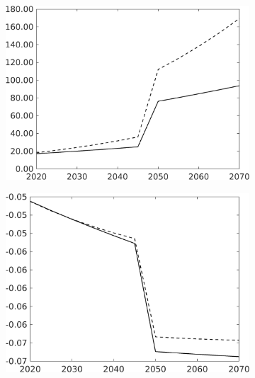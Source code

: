 \begin{figure}[h!!!]
\begin{subfigure}[]{0.32\textwidth}
	\end{subfigure}
	\begin{subfigure}[]{0.32\textwidth}
		\includegraphics[width=1\textwidth]{../../codding_model/own_basedOnFried/optimalPol_010922_revision/figures/all_13Sept22_Tplus30/GFF_PercentageLFDyn_Target_regime4_knspil1_spillover0_noskill0_sep0_xgrowth0_PV1_etaa0.79_lgd0.png}
	\end{subfigure}
	\begin{subfigure}[]{0.32\textwidth}
		\includegraphics[width=1\textwidth]{../../codding_model/own_basedOnFried/optimalPol_010922_revision/figures/all_13Sept22_Tplus30/EY_PercentageLFDyn_Target_regime4_knspil1_spillover0_noskill0_sep0_xgrowth0_PV1_etaa0.79_lgd0.png}

\end{subfigure}
\end{figure}
